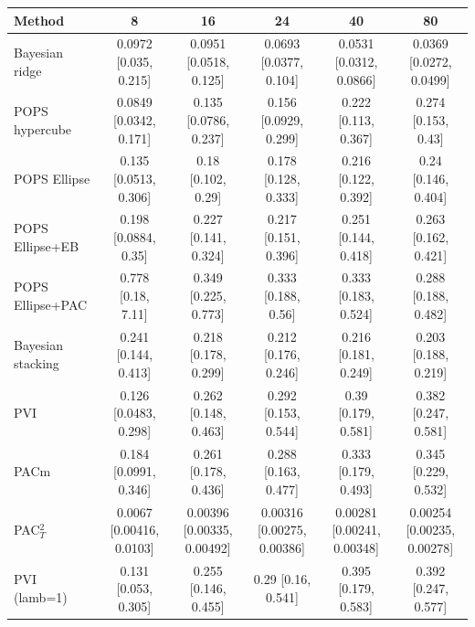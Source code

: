 \begin{tabular}{lccccc}
\toprule
Method & 8 & 16 & 24 & 40 & 80 \\
\midrule
Bayesian ridge & 0.0972 {\scriptsize[0.035, 0.215]} & 0.0951 {\scriptsize[0.0518, 0.125]} & 0.0693 {\scriptsize[0.0377, 0.104]} & 0.0531 {\scriptsize[0.0312, 0.0866]} & 0.0369 {\scriptsize[0.0272, 0.0499]} \\
POPS hypercube & 0.0849 {\scriptsize[0.0342, 0.171]} & 0.135 {\scriptsize[0.0786, 0.237]} & 0.156 {\scriptsize[0.0929, 0.299]} & 0.222 {\scriptsize[0.113, 0.367]} & 0.274 {\scriptsize[0.153, 0.43]} \\
POPS Ellipse & 0.135 {\scriptsize[0.0513, 0.306]} & 0.18 {\scriptsize[0.102, 0.29]} & 0.178 {\scriptsize[0.128, 0.333]} & 0.216 {\scriptsize[0.122, 0.392]} & 0.24 {\scriptsize[0.146, 0.404]} \\
POPS Ellipse+EB & 0.198 {\scriptsize[0.0884, 0.35]} & 0.227 {\scriptsize[0.141, 0.324]} & 0.217 {\scriptsize[0.151, 0.396]} & 0.251 {\scriptsize[0.144, 0.418]} & 0.263 {\scriptsize[0.162, 0.421]} \\
POPS Ellipse+PAC & 0.778 {\scriptsize[0.18, 7.11]} & 0.349 {\scriptsize[0.225, 0.773]} & 0.333 {\scriptsize[0.188, 0.56]} & 0.333 {\scriptsize[0.183, 0.524]} & 0.288 {\scriptsize[0.188, 0.482]} \\
Bayesian stacking & 0.241 {\scriptsize[0.144, 0.413]} & 0.218 {\scriptsize[0.178, 0.299]} & 0.212 {\scriptsize[0.176, 0.246]} & 0.216 {\scriptsize[0.181, 0.249]} & 0.203 {\scriptsize[0.188, 0.219]} \\
PVI & 0.126 {\scriptsize[0.0483, 0.298]} & 0.262 {\scriptsize[0.148, 0.463]} & 0.292 {\scriptsize[0.153, 0.544]} & 0.39 {\scriptsize[0.179, 0.581]} & 0.382 {\scriptsize[0.247, 0.581]} \\
PACm & 0.184 {\scriptsize[0.0991, 0.346]} & 0.261 {\scriptsize[0.178, 0.436]} & 0.288 {\scriptsize[0.163, 0.477]} & 0.333 {\scriptsize[0.179, 0.493]} & 0.345 {\scriptsize[0.229, 0.532]} \\
PAC$^2_T$ & 0.0067 {\scriptsize[0.00416, 0.0103]} & 0.00396 {\scriptsize[0.00335, 0.00492]} & 0.00316 {\scriptsize[0.00275, 0.00386]} & 0.00281 {\scriptsize[0.00241, 0.00348]} & 0.00254 {\scriptsize[0.00235, 0.00278]} \\
PVI (lamb=1) & 0.131 {\scriptsize[0.053, 0.305]} & 0.255 {\scriptsize[0.146, 0.455]} & 0.29 {\scriptsize[0.16, 0.541]} & 0.395 {\scriptsize[0.179, 0.583]} & 0.392 {\scriptsize[0.247, 0.577]} \\

\end{tabular}
